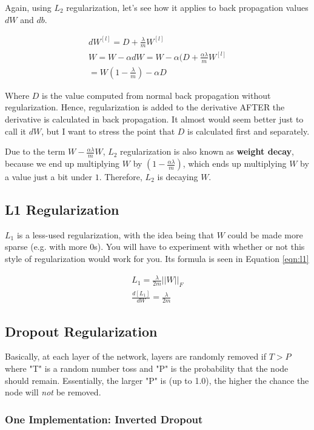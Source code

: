 \documentclass{article}
\begin{document}
Again, using $L_2$ regularization, let's see how it applies to back propagation values $dW$ and $db$.

\begin{gather}
dW^{[l]} = D + \frac{\lambda}{m} W^{[l]} \\
W = W - \alpha dW = W - \alpha (D + \frac{\alpha \lambda}{m} W^{[l]} \\
= W(1 - \frac{\lambda}{m}) - \alpha D
\end{gather}

Where $D$ is the value computed from normal back propagation without regularization.  Hence, regularization is added to the derivative AFTER the derivative is calculated in back propagation.  It almost would seem better just to call it $dW$, but I want to stress the point that $D$ is calculated first and separately.

Due to the term $W - \frac{\alpha\lambda}{m} W$, $L_2$ regularization is also known as \textbf{weight decay}, because we end up multiplying $W$ by $(1 - \frac{\alpha\lambda}{m})$, which ends up multiplying $W$ by a value just a bit under $1$.  Therefore, $L_2$ is decaying $W$.

\subsection{L1 Regularization}

$L_{1}$ is a less-used regularization, with the idea being that $W$ could be made more sparse (e.g. with more 0s).  You will have to experiment with whether or not this style of regularization would work for you.  Its formula is seen in Equation \ref{eqn:l1}

\begin{gather} \label{eqn:l1}
L_{1} = \frac{\lambda}{2m} ||W||_{F} \\
\frac{d[L_{1}]}{dW} = \frac{\lambda}{2m}
\end{gather}

\subsection{Dropout Regularization}

Basically, at each layer of the network, layers are randomly removed if $T > P$ where "T" is a random number toss and "P" is the probability that the node should remain.  Essentially, the larger "P" is (up to 1.0), the higher the chance the node will \textit{not} be removed.

\subsubsection{One Implementation: Inverted Dropout}
\end{document}
